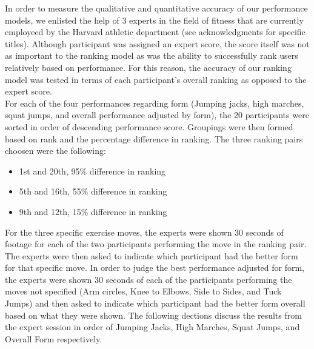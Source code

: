 In order to measure the qualitative and quantitative accuracy of our performance models, we enlisted the help of 3 experts in the field of fitness that are currently employeed by the Harvard athletic department (see acknowledgments for specific titles).   Although participant was assigned an expert score, the score itself was not as important to the ranking model as was the ability to successfully rank users relatively based on performance.  For this reason, the accuracy of our ranking model was tested in terms of each participant's overall ranking as opposed to the expert score.\\
 For each of the four performances regarding form (Jumping jacks, high marches, squat jumps, and overall performance adjusted by form), the 20 participants were sorted in order of descending performance score.  Groupings were then formed based on rank and the percentage difference in ranking.  The three ranking pairs choosen were the following: \\
\begin{itemize}
	\item{1st and 20th, 95\% difference in ranking} \\
	\item{5th and 16th, 55\% difference in ranking} \\
	\item{9th and 12th, 15\% difference in ranking} 
\end{itemize}
For the three specific exercise moves, the experts were shown 30 seconds of footage for each of the two participants performing the move in the ranking pair.  The experts were then asked to indicate which participant had the better form for that specific move.  In order to judge the best performance adjusted for form, the experts were shown 30 seconds of each of the participants performing the moves not specified (Arm circles, Knee to Elbows, Side to Sides, and Tuck Jumps) and then asked to indicate which participant had the better form overall based on what they were shown.  The following dections discuss the results from the expert session in order of Jumping Jacks, High Marches, Squat Jumps, and Overall Form respectively.\\

